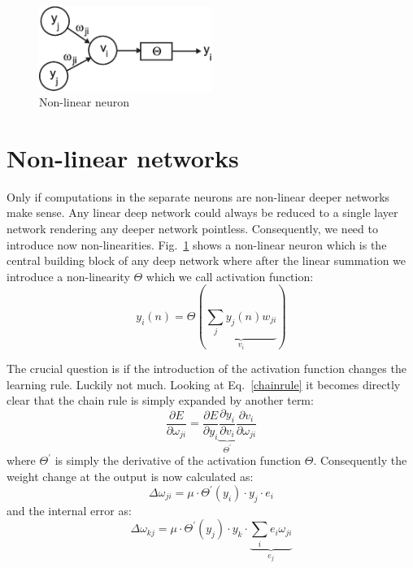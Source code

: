 \documentclass[12pt]{article}
\begin{document}
\begin{figure}[!hbt]
\begin{center}
\mbox{\includegraphics[width=0.5\textwidth]{nonlin}}
\end{center}
\caption{Non-linear neuron
\label{nonlin}}
\end{figure}

\section{Non-linear networks}
Only if computations in the separate neurons are non-linear
deeper networks make sense. Any linear deep network could always be
reduced to a single layer network rendering any deeper network
pointless. Consequently, we need to introduce now non-linearities.
Fig.~\ref{nonlin} shows a non-linear neuron which is the central building block
of any deep network where after the linear summation we introduce a non-linearity $\Theta$
which we call activation function:
\begin{equation}
  y_i(n) = \Theta\left(\underbrace{\sum_j y_j(n) w_{ji}}_{v_i} \right) \label{nonlinear_sum}
\end{equation}

The crucial question is if the introduction of the activation function
changes the learning rule. Luckily not much.
Looking at Eq.~\ref{chainrule} it becomes directly clear that the
chain rule is simply expanded by another term:
 \begin{equation}
 \frac{\partial E}{\partial \omega_{ji}}  = \frac{\partial E}{\partial y_i} \underbrace{\frac{\partial y_i}{\partial v_i}}_{\Theta^\prime} \frac{\partial v_i}{\partial \omega_{ji}}
 \end{equation}
 where $\Theta^\prime$ is simply the derivative of the activation function $\Theta$. Consequently the
 weight change at the output is now calculated as:
\begin{equation}
  \Delta\omega_{ji} = \mu \cdot \Theta^\prime(y_i) \cdot y_j \cdot e_i 
\end{equation}
and the internal error as:
\begin{equation}
\Delta\omega_{kj} = \mu \cdot \Theta^\prime(y_j) \cdot y_k \cdot \underbrace{\sum_i e_i \omega_{ji}}_{e_j} 
\end{equation}
\end{document}

